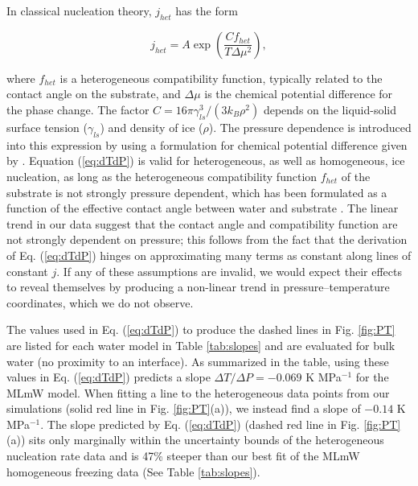 \documentclass[journal abbreviation, manuscript]{copernicus}
\begin{document}
In classical nucleation theory, $j_{het}$ has the form \citep{lamb2011physics}

\begin{equation} \label{eq:R}
    j_{het} = A \exp \! \left(\frac{C f_{het}}{T\Delta \mu ^2} \right),
\end{equation}

\noindent where $f_{het}$ is a heterogeneous compatibility function, typically related to the contact angle on the substrate, and $\Delta \mu$ is the chemical potential difference for the phase change. The factor $C = 16 \pi \gamma_{ls}^3 / (3 k_B \rho^2)$ depends on the liquid-solid surface tension ($\gamma_{ls}$) and density of ice ($\rho$). The pressure dependence is introduced into this expression by using a formulation for chemical potential difference given by \citet{nemec2013}.
Equation (\ref{eq:dTdP}) is valid for heterogeneous, as well as homogeneous, ice nucleation, as long as the heterogeneous compatibility function $f_{het}$ of the substrate is not strongly pressure dependent, which has been formulated as a function of the effective contact angle between water and substrate \citep{lamb2011physics, zobrist2007}. The linear trend in our data suggest that the contact angle and compatibility function are not strongly dependent on pressure; this follows from the fact that the derivation of Eq. (\ref{eq:dTdP}) hinges on approximating many terms as constant along lines of constant $j$. If any of these assumptions are invalid, we would expect their effects to reveal themselves by producing a non-linear trend in pressure--temperature coordinates, which we do not observe.  

The values used in Eq. (\ref{eq:dTdP}) to produce the dashed lines in Fig. \ref{fig:PT} are listed for each water model in Table \ref{tab:slopes} and are evaluated for bulk water (no proximity to an interface). As summarized in the table, using these values in Eq. (\ref{eq:dTdP}) predicts a slope $\Delta T/\Delta P = -0.069$ K MPa$^{-1}$ for the MLmW model. When fitting a line to the heterogeneous data points from our simulations (solid red line in Fig. \ref{fig:PT}(a)), we instead find a slope of $-0.14$ K MPa$^{-1}$. The slope predicted by Eq. (\ref{eq:dTdP}) (dashed red line in Fig. \ref{fig:PT}(a)) sits only marginally within the uncertainty bounds of the heterogeneous nucleation rate data and is 47\% steeper than our best fit of the MLmW homogeneous freezing data (See Table \ref{tab:slopes}).
\end{document}
